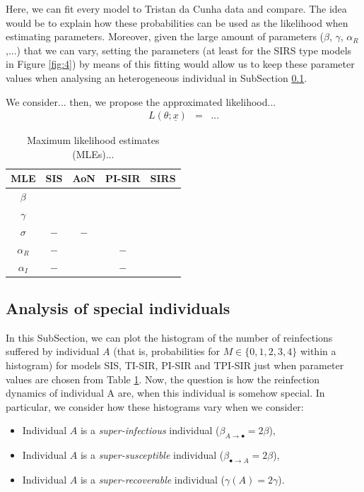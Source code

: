\documentclass[preprint,12pt]{elsarticle}
\begin{document}
\par Here, we can fit every model to Tristan da Cunha data and compare. The idea would be to explain how these probabilities can be used as the likelihood when estimating parameters. Moreover, given the large amount of parameters ($\beta$, $\gamma$, $\alpha_R$,...) that we can vary, setting the parameters (at least for the SIRS type models in Figure \ref{fig:4}) by means of this fitting would allow us to keep these parameter values when analysing an heterogeneous individual in SubSection \ref{SubSect33}.

\par We consider... then, we propose the approximated likelihood...
\begin{eqnarray*}
L(\theta;{\underline x}) &=& \dots
\end{eqnarray*}

\begin{table}[h!]
{\small
\centering
\begin{tabular}{|c|c|c|c|c|}
\hline
MLE & SIS & AoN & PI-SIR & SIRS\\
\hline
$\beta$ & & & & \\
\hline
$\gamma$ & & & & \\
\hline
$\sigma$ & $-$ & $-$ & & \\
\hline
$\alpha_R$ & $-$ & & $-$ & \\
\hline
$\alpha_I$ & $-$ & & $-$ & \\
\hline
\end{tabular}
\caption{Maximum likelihood estimates (MLEs)...}
\label{tab:tristan}}
\end{table}


\subsection{Analysis of special individuals}
\label{SubSect33}

\par In this SubSection, we can plot the histogram of the number of reinfections suffered by individual $A$ (that is, probabilities for $M\in\{0,1,2,3,4\}$ within a histogram) for models SIS, TI-SIR, PI-SIR and TPI-SIR just when parameter values are chosen from Table \ref{tab:tristan}. Now, the question is how the reinfection dynamics of individual A are, when this individual is somehow special. In particular, we consider how these histograms vary when we consider:
\begin{itemize}
 \item Individual $A$ is a {\it super-infectious} individual ($\beta_{A\rightarrow\bullet}=2\beta$),
 \item Individual $A$ is a {\it super-susceptible} individual ($\beta_{\bullet\rightarrow A}=2\beta$),
 \item Individual $A$ is a {\it super-recoverable} individual ($\gamma(A)=2\gamma$).
\end{itemize}
\end{document}
